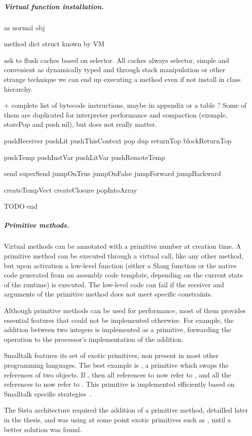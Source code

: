\documentclass[a4paper,12pt,twoside]{../includes/ThesisStyle}
\begin{document}
\subparagraph{Virtual function installation.}

as normal obj

method dict struct known by VM

ask to flush caches based on selector. All caches always selector, simple and convenient as dynamically typed and through stack manipulation or other strange technique we can end up executing a method even if not install in class hierarchy.

+ complete list of bytecode instructions, maybe in appendix or a table ? Some of them are duplicated for interpreter performance and compaction (exemple, storePop and push nil), but does not really matter.

pushReceiver
pushLit
pushThisContext
pop
dup
returnTop
blockReturnTop

pushTemp
pushInstVar
pushLitVar
pushRemoteTemp

send 
superSend
jumpOnTrue
jumpOnFalse
jumpForward
jumpBackward

createTempVect
createClosure
popIntoArray

TODO end

\subparagraph{Primitive methods.}

Virtual methods can be annotated with a primitive number at creation time. A primitive method can be executed through a virtual call, like any other method, but upon activation a low-level function (either a Slang function or the native code generated from an assembly code template, depending on the current state of the runtime) is executed. The low-level code can fail if the receiver and arguments of the primitive method does not meet specific constraints. 

Although primitive methods can be used for performance, most of them provides essential features that could not be implemented otherwise. For example, the addition between two integers is implemented as a primitive, forwarding the operation to the processor's implementation of the addition.

Smalltalk features its set of exotic primitives, non present in most other programming languages. The best example is , a primitive which swaps the references of two objects. If , then all references to  now refer to , and all the references to  now refer to . This primitive is implemented efficiently based on Smalltalk specific strategies~\cite{Mir15a}.

The Sista architecture required the addition of a primitive method, detailled later in the thesis, and was using at some point exotic primitives such as , until a better solution was found.
\end{document}
